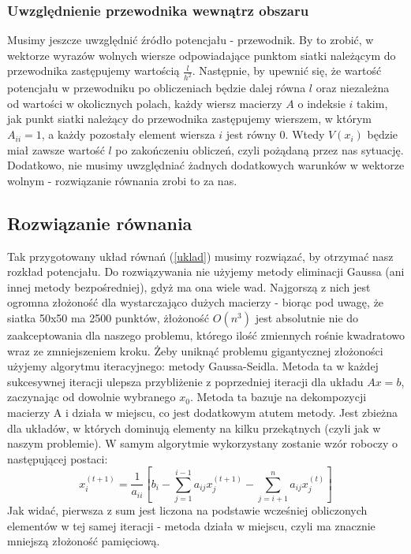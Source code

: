 \documentclass{article}
\begin{document}
\subsubsection{Uwzględnienie przewodnika wewnątrz obszaru}
Musimy jeszcze uwzględnić źródło potencjału - przewodnik. By to zrobić, w wektorze wyrazów wolnych wiersze odpowiadające
punktom siatki należącym do przewodnika zastępujemy wartością $\frac{l}{h^2}$. Następnie, by upewnić się, że wartość
potencjału w przewodniku po obliczeniach będzie dalej równa $l$ oraz niezależna od wartości w okolicznych polach, każdy wiersz
macierzy $A$ o indeksie $i$ takim, jak punkt siatki należący do przewodnika zastępujemy wierszem, w którym $A_{ii}=1$, a
każdy pozostały element wiersza $i$ jest równy $0$. Wtedy $V(x_{i})$ będzie miał zawsze wartość $l$ po zakończeniu obliczeń,
czyli pożądaną przez nas sytuację. Dodatkowo, nie musimy uwzględniać żadnych dodatkowych warunków w wektorze wolnym - 
rozwiązanie równania zrobi to za nas.
\subsection{Rozwiązanie równania}
Tak przygotowany układ równań (\ref{uklad}) musimy rozwiązać, by otrzymać nasz rozkład potencjału. 
Do rozwiązywania nie użyjemy metody eliminacji Gaussa (ani innej metody bezpośredniej), gdyż ma ona wiele
wad. Najgorszą z nich jest ogromna złożoność dla wystarczająco dużych macierzy - biorąc pod uwagę, że siatka
50x50 ma 2500 punktów, żłożoność $O(n^3)$ jest absolutnie nie do zaakceptowania dla naszego problemu, którego
ilość zmiennych rośnie kwadratowo wraz ze zmniejszeniem kroku.
Żeby uniknąć problemu gigantycznej złożoności użyjemy algorytmu iteracyjnego: metody Gaussa-Seidla. Metoda ta
w każdej sukcesywnej iteracji ulepsza przybliżenie z poprzedniej iteracji dla układu $Ax=b$, zaczynając od 
dowolnie wybranego $x_0$. Metoda ta bazuje na dekompozycji macierzy A i działa w miejscu, co jest dodatkowym
atutem metody. Jest zbieżna dla układów, w których dominują elementy na kilku przekątnych (czyli jak w naszym problemie).
W samym algorytmie wykorzystany zostanie wzór roboczy o następującej postaci:
\begin{equation}
\label{rob}
x_i^{(t+1)} = \frac{1}{a_{ii}}[b_i - \sum_{j=1}^{i-1} a_{ij}x_j^{(t+1)} - \sum_{j=i+1}^{n} a_{ij} x_j^{(t)}]
\end{equation}
Jak widać, pierwsza z sum jest liczona na podstawie wcześniej obliczonych elementów w tej samej iteracji - metoda
działa w miejscu, czyli ma znacznie mniejszą złożoność pamięciową.
\end{document}
